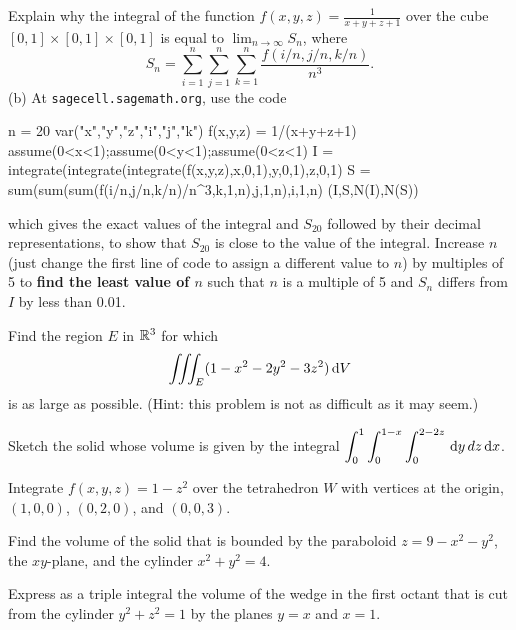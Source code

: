\documentclass[prettycode,shellescape]{watsonbook}
\begin{document}

\begin{aexercise}
  Explain why the integral of the function
  $f(x,y,z) = \frac{1}{x+y+z+1}$ over the cube
  $[0,1] \times [0,1] \times [0,1]$ is equal to
  $\lim_{n\to\infty} S_n$, where
  \[
    S_n = \sum_{i=1}^n \sum_{j=1}^n \sum_{k=1}^n
    \frac{f(i/n,j/n,k/n)}{n^3}.
  \]
  (b) At \texttt{sagecell.sagemath.org}, use the code
\begin{pythonblock}[title=]
n = 20
var("x","y","z","i","j","k")
f(x,y,z) = 1/(x+y+z+1)
assume(0<x<1);assume(0<y<1);assume(0<z<1)
I = integrate(integrate(integrate(f(x,y,z),x,0,1),y,0,1),z,0,1)
S = sum(sum(sum(f(i/n,j/n,k/n)/n^3,k,1,n),j,1,n),i,1,n)
(I,S,N(I),N(S))
\end{pythonblock}
  which gives the exact values of the integral and $S_{20}$ followed
  by their decimal representations, to show that $S_{20}$ is close to
  the value of the integral. Increase $n$ (just change the first line
  of code to assign a different value to $n$) by multiples of 5 to
  \textbf{find the least value of $n$} such that $n$ is a multiple of
  5 and $S_n$ differs from $I$ by less than 0.01.
\end{aexercise}

\begin{aexercise}
  Find the region $E$ in $\mathbb{R}^3$ for which
  \[
    \iiint_E (1-x^2-2y^2-3z^2) \, {\mathrm{d}}V
  \]
  is as large as possible. (Hint: this problem is not as difficult as
  it may seem.)
\end{aexercise}


\begin{aexercise}
  Sketch the solid whose volume is given by the integral $\displaystyle{\int_0^1
    \int_0^{1-x}\int_0^{2-2z}\,\mathrm{d}y\,dz\,\mathrm{d}x}$.
\end{aexercise}

\begin{aexercise}
  Integrate $f(x,y,z) = 1-z^2$ over the tetrahedron $W$ with vertices
  at the origin, $(1,0,0)$, $(0,2,0)$, and $(0,0,3)$.
\end{aexercise}


\begin{aexercise}
  Find the volume of the solid that is bounded by the paraboloid
  $z = 9 - x^2 - y^2$, the $xy$-plane, and the cylinder
  $x^2 + y^2 = 4$.
\end{aexercise}

\begin{aexercise}
  Express as a triple integral the volume of the wedge in the first
  octant that is cut from the cylinder $y^2+z^2 = 1$ by the planes
  $y=x$ and $x=1$.
\end{aexercise}
\end{document}
